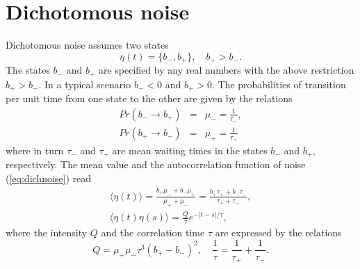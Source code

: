 \documentclass[12pt]{iopart}
\begin{document}
\section{Dichotomous noise}	
Dichotomous noise \cite{BroHan1984,KulCze1996,bena} assumes two states
\begin{equation}
\label{eq:dichnoise}
\eta(t) = \{b_-, b_+\}, \quad b_+>b_-.
\end{equation}
The states  $b_-$ and $b_+$ are specified by any real numbers with the above restriction $b_+>b_-$. In a typical scenario $b_-<0$ and $b_+>0$. The probabilities of transition per unit time from one state to the other are given by the relations
\begin{eqnarray}
\label{eq:dnmuab}
Pr(b_- \to b_+) &=& \mu_- = \frac{1}{\tau_-},\nonumber\\
Pr(b_+ \to b_-) &=& \mu_+ = \frac{1}{\tau_+}
\end{eqnarray}
where in turn $\tau_-$ and $\tau_+$ are mean waiting times in the states $b_-$ and $b_+$, respectively. The mean value and the autocorrelation function of noise (\ref{eq:dichnoise}) read
\begin{eqnarray}
\label{eq:dnmoments}
\langle \eta(t) \rangle = \frac{b_+ \mu_- + b_- \mu_+}{\mu_+ + \mu_-} = \frac{b_+ \tau_{+} + b_- \tau_{-}}{\tau_{+} + \tau_{-}}, \\
\langle \eta(t) \eta(s) \rangle = \frac{Q}{\tau} e^{-|t-s|/\tau}, 
\end{eqnarray}
where the intensity $Q$ and the correlation time $\tau$ are expressed by the relations
\begin{equation}
\label{eq:dnintensity}
Q = \mu_+ \mu_- \tau^3 (b_+ -b_-)^2 , \quad \frac{1}{\tau} = \frac{1}{\tau_+} + \frac{1}{\tau_-}. 
\end{equation}
\end{document}
